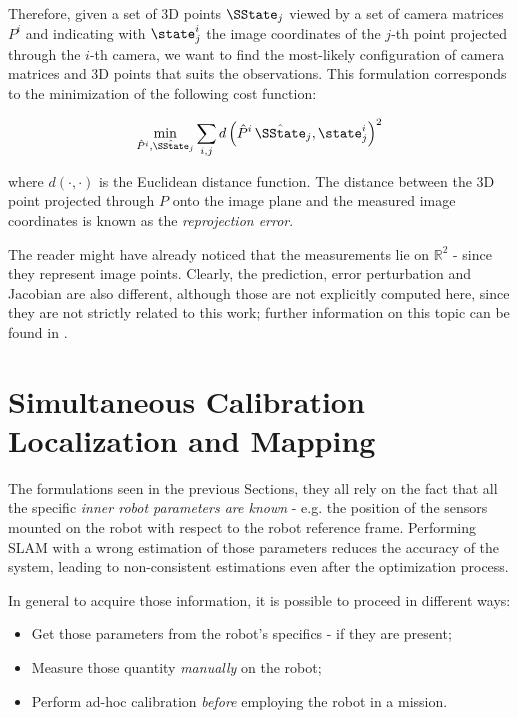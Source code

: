 Therefore, given a set of 3D points $\SState_j$ viewed by a set of camera matrices $P^i$ and indicating with $\state_j^i$ the image coordinates of the $j$-th point projected through the $i$-th camera, we want to find the most-likely configuration of camera matrices and 3D points that suits the observations. This formulation corresponds to the minimization of the following cost function:

\begin{equation}
    \min_{\hat{P}^i, \hat{\SState}_j} \sum_{i,j} d\left(\hat{P}^i\,\hat{\SState}_j, \state_j^i\right)^2
    \label{eq:reprojection_error}
\end{equation}

\noindent where $d(\cdot, \cdot)$ is the Euclidean distance function. The distance between the 3D point projected through $P$ onto the image plane and the measured image coordinates is known as the \textit{reprojection error}.

The reader might have already noticed that the measurements lie on $\mathbb{R}^2$ - since they represent image points. Clearly, the prediction, error perturbation and Jacobian are also different, although those are not explicitly computed here, since they are not strictly related to this work; further information on this topic can be found in \cite{hartley2003multiple, szeliski2010computer, indelman2015incremental}.

\section{Simultaneous Calibration Localization and Mapping}\label{sec:sclam}
The formulations seen in the previous Sections, they all rely on the fact that all the specific \textit{inner robot parameters are known} - e.g. the position of the sensors mounted on the robot with respect to the robot reference frame. Performing SLAM with a wrong estimation of those parameters reduces the accuracy of the system, leading to non-consistent estimations even after the optimization process.

In general to acquire those information, it is possible to proceed in different ways:

\begin{itemize}
    \item Get those parameters from the robot's specifics - if they are present;
    \item Measure those quantity \textit{manually} on the robot;
    \item Perform ad-hoc calibration \textit{before} employing the robot in a mission.
\end{itemize}

